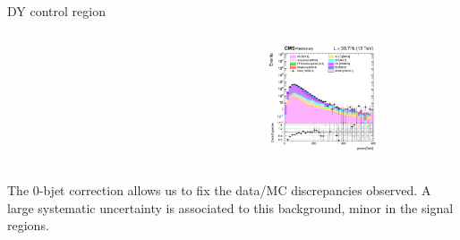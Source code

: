 \documentclass[8pt]{beamer}
\begin{document}
\begin{frame}{DY control region}
\begin{columns}
\begin{column}{0.33\textwidth}
\begin{center}
    		\end{center}		
		\end{column}
		\begin{column}{0.33\textwidth}
			\begin{center}
     			\includegraphics[width=1.0\textwidth, height=90pt]{figs/2018/log_cratio_dyCR_ll_METcorrected_pt.png}
    		\end{center}		
		\end{column}
\end{columns} \vfill

The 0-bjet correction allows us to fix the data/MC discrepancies observed. A large systematic uncertainty is associated to this background, minor in the signal regions. \vfill
\end{frame}
\end{document}
